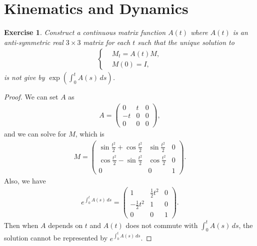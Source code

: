 \documentclass[10pt]{book}
\newtheorem{exercise}{Exercise}[section]
\theoremstyle{definition}
\numberwithin{equation}{chapter}
\begin{document}
\medskip

\section{Kinematics and Dynamics}

\begin{exercise}
Construct a continuous matrix function $A(t)$ where $A(t)$ is an anti-symmetric real $3\times 3$ matrix for each $t$ such that the unique solution to
\begin{align*}
    \left\{ 
    \begin{aligned}
        & M_t = A(t)M,\\
        & M(0) = I,
    \end{aligned}
    \right.
\end{align*}
is not give by $\exp\left(\int^t_0 A(s)\, ds \right)$.
\end{exercise}
\begin{proof}
We can set $A$ as 
\begin{align*}
    A = \begin{pmatrix}
        0 & t & 0 \\
        -t & 0 & 0 \\
        0 & 0 & 0 
    \end{pmatrix},
\end{align*}
and we can solve for $M$, which is
\begin{align*}
    M = \begin{pmatrix}
        \sin \frac{t^2}{2} + \cos \frac{t^2}{2} &  \sin \frac{t^2}{2} & 0 \\
        \cos \frac{t^2}{2} - \sin \frac{t^2}{2} &  \cos \frac{t^2}{2} & 0 \\
        0 & 0 & 1 
    \end{pmatrix}.
\end{align*}
Also, we have 
\begin{align*}
    e^{\int^t_0 A(s)\, ds} = \begin{pmatrix}
        1 & \frac{1}{2} t^2 & 0 \\
        -\frac{1}{2} t^2 & 1 & 0 \\
        0 & 0 & 1 
    \end{pmatrix}.
\end{align*}
Then when $A$ depends on $t$ and $A(t)$ does not commute with $\int^t_0 A(s)\, ds$, the solution cannot be represented by $e^{\int^t_0 A(s)\, ds}$.
\end{proof}

\medskip
\end{document}
